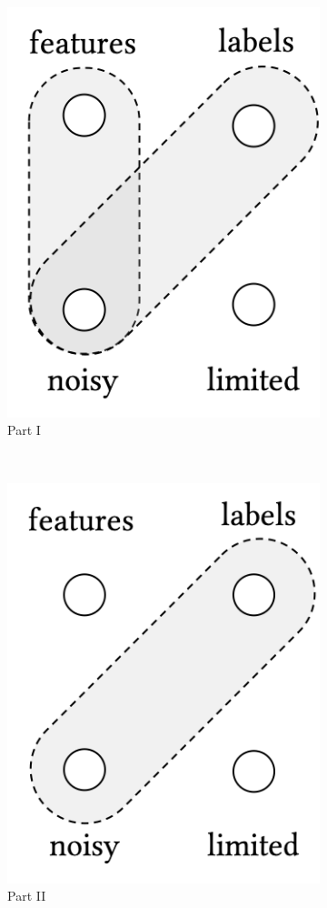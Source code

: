 \begin{figure}[t]
    \centering
    \begin{subfigure}[b]{0.32\textwidth}
    \centering
        \includegraphics[width=0.55\linewidth]{01-introduction/figs_and_tables/fig_p1.png}
        \caption{\label{fig:p1}Part I}
    \end{subfigure}
        ~ 
    \begin{subfigure}[b]{0.32\textwidth}
    \centering
        \includegraphics[width=0.55\linewidth]{01-introduction/figs_and_tables/fig_p2.png}
        \caption{\label{fig:p2}Part II}
    \end{subfigure}
        ~ 
    \begin{subfigure}[b]{0.32\textwidth}
    \centering

\end{subfigure}
\end{figure}
